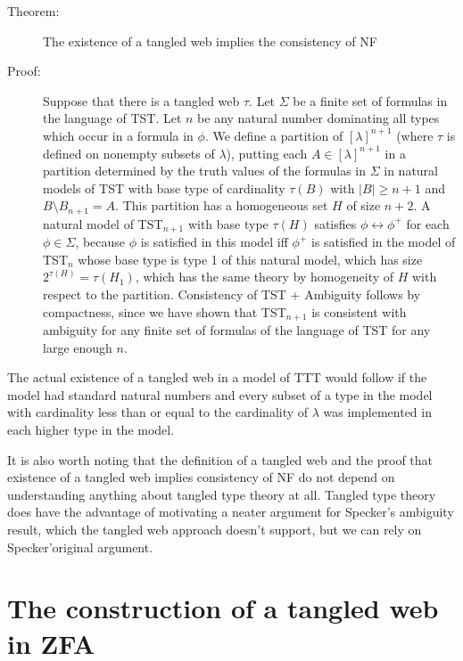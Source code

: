 \documentclass[12pt]{article}
\begin{document}
\begin{description}

\item[Theorem:]  The existence of a tangled web implies the consistency of NF

\item[Proof:]  Suppose that there is a tangled web $\tau$.  Let $\Sigma$ be a finite set of formulas in the language of TST.  Let $n$ be any natural number dominating all types which occur
in a formula in $\phi$.  We define a partition of $[\lambda]^{n+1}$ (where $\tau$ is defined on nonempty subsets of $\lambda$), putting each $A \in [\lambda]^{n+1}$ in a partition
determined by the truth values of the formulas in $\Sigma$ in natural models of TST with base type of cardinality $\tau(B)$ with $|B|\geq n+1$ and $B \setminus B_{n+1}=A$.  This partition has a homogeneous set $H$ of size $n+2$.  A natural model of TST$_{n+1}$ with base type $\tau(H)$ satisfies $\phi \leftrightarrow \phi^+$ for each $\phi \in \Sigma$, because
$\phi$ is satisfied in this model iff $\phi^+$ is satisfied in the model  of TST$_n$ whose base type is type 1 of this natural model, which has size $2^{\tau(H)} = \tau(H_1)$, which has the same theory by homogeneity of $H$ with respect to the partition.  Consistency of TST + Ambiguity follows by compactness, since we have shown that TST$_{n+1}$ is consistent with ambiguity for any finite set of formulas of the language of TST for any large enough $n$.

\end{description}

The actual existence of a tangled web in a model of TTT would follow if the model had standard natural numbers and every subset of a type in the model with cardinality less than or equal to the cardinality of $\lambda$  was implemented in each higher type in the model.

It is also worth noting that the definition of a tangled web and the proof that existence of a tangled web implies consistency of NF do not depend on understanding anything about tangled type theory at all.  Tangled type theory does have the advantage of motivating a neater argument for Specker's ambiguity result, which the tangled web approach doesn't support, but we can rely on Specker'original argument.

\newpage

\section{The construction of a tangled web in ZFA}
\end{document}
